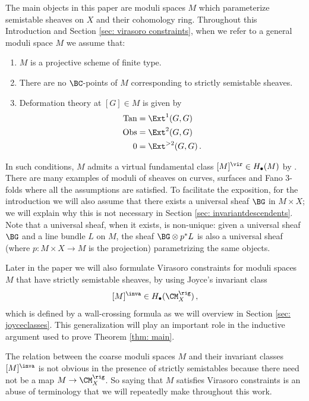 The main objects in this paper are moduli spaces $M$ which parameterize semistable sheaves on $X$ and their cohomology ring. Throughout this Introduction and Section \ref{sec: virasoro constraints}, when we refer to a general moduli space $M$ we assume that:
\begin{enumerate}
\item $M$ is a projective scheme of finite type.
\item There are no $\BC$-points of  $M$ corresponding to strictly semistable sheaves.
\item Deformation theory at $[G]\in M$ is given by
\begin{align*}
\textup{Tan}&=\Ext^1(G,G)\\
\textup{Obs}&=\Ext^2(G,G)\\
0&=\Ext^{>2}(G,G)\,.
\end{align*}
\end{enumerate}


In such conditions, $M$ admits a virtual fundamental class $[M]^\vir\in H_\bullet(M)$ by \cite{BF}. There are many examples of moduli of sheaves on curves, surfaces and Fano 3-folds where all the assumptions are satisfied. To facilitate the exposition, for the introduction we will also assume that there exists a universal sheaf $\BG$ in $M\times X$; we will explain why this is not necessary in Section \ref{sec: invariantdescendents}. Note that a universal sheaf, when it exists, is non-unique: given a universal sheaf $\BG$ and a line bundle $L$ on $M$, the sheaf $\BG\otimes p^\ast L$ is also a universal sheaf (where $p\colon M\times X\to M$ is the projection) parametrizing the same objects.

Later in the paper we will also formulate Virasoro constraints for moduli spaces $M$ that have strictly semistable sheaves, by using Joyce's invariant class
\[[M]^\inva \in H_\bullet(\CM_X^\rig)\,,\]
which is defined by a wall-crossing formula as we will overview in Section \ref{sec: joyceclasses}. This generalization will play an important role in the inductive argument used to prove Theorem \ref{thm: main}.
\begin{remark}
\notready
\label{rem:nocoarsedirect}
    The relation between the coarse moduli spaces $M$ and their invariant classes $[M]^{\inva}$ is not obvious in the presence of strictly semistables because there need not be a map $M\to \CM_X^{\rig}$. So saying that $M$ satisfies Virasoro constraints is an abuse of terminology that we will repeatedly make throughout this work.
\end{remark}


